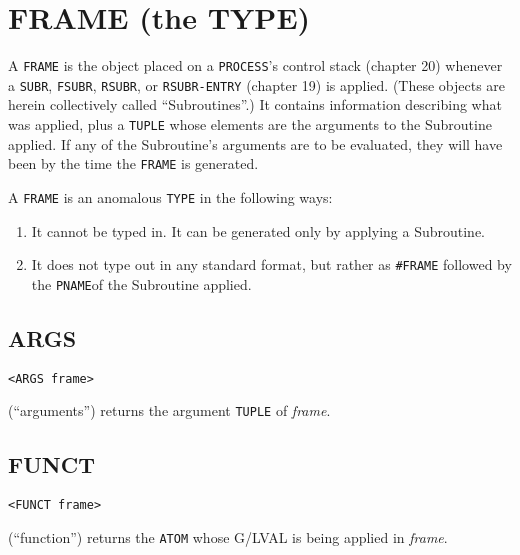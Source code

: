\documentclass[a4paper]{scrbook}
\providecommand{\tightlist}{%
  \setlength{\itemsep}{0pt}\setlength{\parskip}{0pt}}
\begin{document}
\section{FRAME (the TYPE)}\label{frame-the-type}

A \texttt{FRAME} is the object placed on a \texttt{PROCESS}'s control stack (chapter 20)
whenever a \texttt{SUBR}, \texttt{FSUBR}, \texttt{RSUBR},
or \texttt{RSUBR-ENTRY} (chapter 19) is applied. (These objects are herein collectively called
``Subroutines''.) It contains information describing what was applied, plus a \texttt{TUPLE}
whose elements are the arguments to the Subroutine applied. If any of the Subroutine's arguments are to be evaluated, they
will have been by the time the \texttt{FRAME} is generated.

A \texttt{FRAME} is an anomalous \texttt{TYPE} in the following ways:

\begin{enumerate}
\def\labelenumi{\arabic{enumi}.}
\tightlist
\item
  It cannot be typed in. It can be generated only by applying a Subroutine.
\item
  It does not type out in any standard format, but rather as \texttt{\#FRAME} followed by the \texttt{PNAME}of the
  Subroutine applied.
\end{enumerate}

\subsection{ARGS}\label{args-1}

\begin{verbatim}
<ARGS frame>
\end{verbatim}

 (``arguments'') returns the argument \texttt{TUPLE} of \emph{frame}.

\subsection{FUNCT}\label{funct}

\begin{verbatim}
<FUNCT frame>
\end{verbatim}

 (``function'') returns the \texttt{ATOM} whose G/LVAL is being applied
in \emph{frame}.
\end{document}
